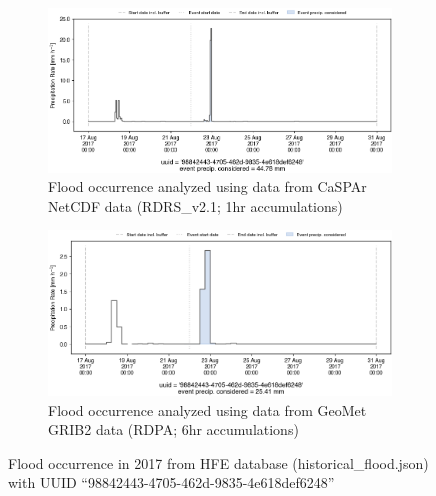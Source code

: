 \documentclass[10pt,a4paper,titlepage,parskip]{scrartcl}
\begin{document}
\begin{figure}[h]
	\begin{subfigure}[a]{1.0\textwidth}
		\centering
		\includegraphics[width=\linewidth]{figures/compare_Geomet_CaSPAr/interpolated_at_stations_occurrence_965_identified-timesteps_RDRS_v2.1.png}
		\caption{Flood occurrence analyzed using data from CaSPAr NetCDF data (RDRS\_v2.1; 1hr accumulations)}
	\end{subfigure}
	\par\bigskip\bigskip
	\begin{subfigure}[b]{1.0\textwidth}
		\centering
		\includegraphics[width=\linewidth]{figures/compare_Geomet_CaSPAr/interpolated_at_stations_occurrence_965_identified-timesteps_rdpa_10km_6f.png}
		\caption{Flood occurrence analyzed using data from GeoMet GRIB2 data (RDPA; 6hr accumulations)}
	\end{subfigure}
	\par\bigskip\bigskip
	\caption{Flood occurrence in 2017 from HFE database (historical\_flood.json) with UUID ``98842443-4705-462d-9835-4e618def6248''}
\end{figure}
\pagebreak
\end{document}
